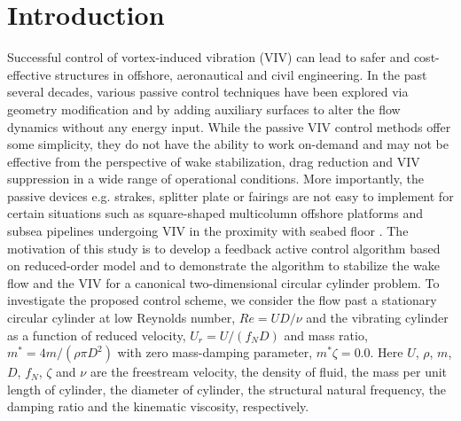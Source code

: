 \documentclass[standard]{jfm}
\begin{document}
\section{Introduction}\label{sec:intro}
Successful control of vortex-induced vibration (VIV) can lead to 
safer and cost-effective structures in offshore, aeronautical and civil engineering. 
In the past several decades, various passive control techniques \citep{owen2001,Choi2008,Baek2009,Yu2015,Law2017} have been explored 
via geometry modification and by adding auxiliary surfaces to alter the flow dynamics without any energy input. 
While the passive VIV control methods offer some simplicity, 
they do not have the ability to work on-demand and may not be effective from 
the perspective of wake stabilization, drag reduction and VIV suppression 
in a wide range of operational conditions.
More importantly, the passive devices e.g. strakes, splitter plate or fairings 
are not easy to implement for certain situations such as  square-shaped 
multicolumn offshore platforms \citep{chakrabarti} and subsea pipelines undergoing VIV in the proximity with seabed floor \citep{sumer}. 
%
The motivation of this study is to develop a feedback active 
control algorithm based on reduced-order model and to demonstrate the algorithm 
to stabilize the wake flow and the VIV for a canonical two-dimensional circular cylinder 
problem. To investigate the proposed control scheme, we consider the flow past a 
stationary circular cylinder at low Reynolds number, $Re=UD/\nu$ 
and the vibrating cylinder as a function of reduced velocity, $U_r=U/(f_{N}D)$  and 
mass ratio, $m^*=4 m/({\rho \pi D^{2}})$ with zero mass-damping parameter, $m^* \zeta = 0.0$. 
Here $U$, $\rho$, $m$, $D$, $f_{N}$, $\zeta$ and $\nu$ are the freestream velocity, 
the density of fluid, the mass per unit length of cylinder, the diameter of cylinder, 
the structural natural frequency, the damping ratio and the kinematic viscosity, respectively.
\end{document}
